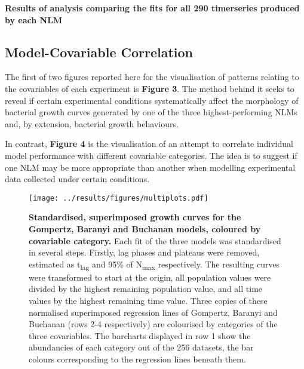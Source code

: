 \documentclass[11pt]{article}
\begin{document}
\begin{table}[htb]
    \centering
    \caption{\textbf{Results of analysis comparing the fits for all 290 timerseries produced by each NLM}}
\end{table}


\subsection{Model-Covariable Correlation}

The first of two figures reported here for the visualisation of patterns relating to the covariables of each experiment is \textbf{Figure 3}. The method behind it seeks to reveal if certain experimental conditions systematically affect the morphology of bacterial growth curves generated by one of the three highest-performing NLMs and, by extension, bacterial growth behaviours.

In contrast, \textbf{Figure 4} is the visualisation of an attempt to correlate individual model performance with different covariable categories. The idea is to suggest if one NLM may be more appropriate than another when modelling experimental data collected under certain conditions.


\begin{figure*}
    \centering
    \texttt{[image: ../results/figures/multiplots.pdf]} %
    \caption{\textbf{Standardised, superimposed growth curves for the Gompertz, Baranyi and Buchanan models, coloured by covariable category.}  Each fit of the three models was standardised in several steps. Firstly, lag phases and plateaus were removed, estimated as t\textsubscript{lag} and 95\% of N\textsubscript{max} respectively. The resulting curves were transformed to start at the origin, all population values were divided by the highest remaining population value, and all time values by the highest remaining time value. Three copies of these normalised superimposed regression lines of Gompertz, Baranyi and Buchanan (rows 2-4 respectively) are colourised by categories of the three covariables. The barcharts displayed in row 1 show the abundancies of each category out of the 256 datasets, the bar colours corresponding to the regression lines beneath them.}
\end{figure*}
\end{document}
